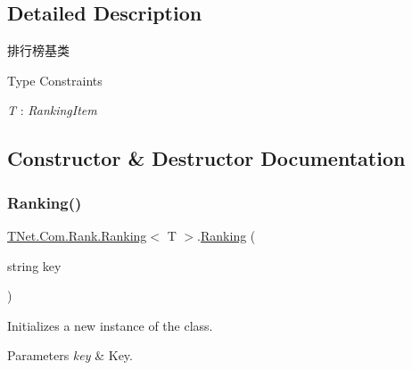 \subsection{Detailed Description}
排行榜基类 

\begin{Desc}
\item[Type Constraints]\begin{description}
\item[{\em T} : {\em Ranking\+Item}]\end{description}
\end{Desc}


\subsection{Constructor \& Destructor Documentation}
\mbox{\label{class_t_net_1_1_com_1_1_rank_1_1_ranking_a73fc28984b075257dca19b9c4ba6bc2b}} 
\subsubsection{\texorpdfstring{Ranking()}{Ranking()}\hspace{0.1cm}{\footnotesize\ttfamily [1/3]}}
{\footnotesize\ttfamily \mbox{\hyperlink{class_t_net_1_1_com_1_1_rank_1_1_ranking}{T\+Net.\+Com.\+Rank.\+Ranking}}$<$ T $>$.\mbox{\hyperlink{class_t_net_1_1_com_1_1_rank_1_1_ranking}{Ranking}} (\begin{DoxyParamCaption}\item[{string}]{key }\end{DoxyParamCaption})\hspace{0.3cm}{\ttfamily [protected]}}



Initializes a new instance of the class. 


\begin{DoxyParams}{Parameters}
{\em key} & Key.\\
\hline
\end{DoxyParams}
\mbox{\label{class_t_net_1_1_com_1_1_rank_1_1_ranking_a4f443d2a327457092ee3943b8cff922c}} 
